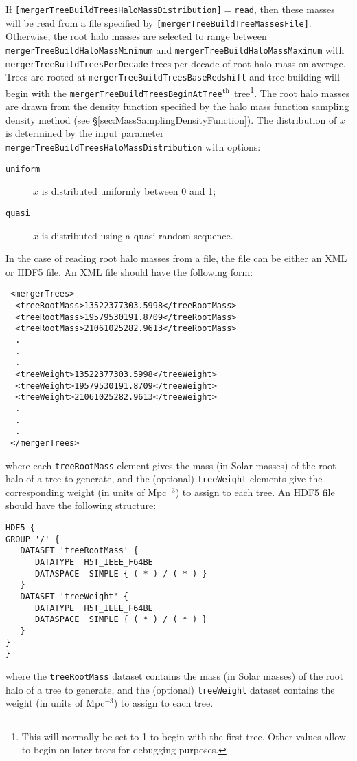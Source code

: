 If {\tt [mergerTreeBuildTreesHaloMassDistribution]}$=${\tt read}, then these masses will be read from a file specified by {\tt [mergerTreeBuildTreeMassesFile]}. Otherwise, the root halo masses are selected to range between {\tt mergerTreeBuildHaloMassMinimum} and {\tt mergerTreeBuildHaloMassMaximum} with {\tt mergerTreeBuildTreesPerDecade} trees per decade of root halo mass on average. Trees are rooted at {\tt mergerTreeBuildTreesBaseRedshift} and tree building will begin with the {\tt mergerTreeBuildTreesBeginAtTree}$^{\rm th}$ tree\footnote{This will normally be set to 1 to begin with the first tree. Other values allow to begin on later trees for debugging purposes.}. The root halo masses are drawn from the density function specified by the halo mass function sampling density method (see \S\ref{sec:MassSamplingDensityFunction}). The distribution of $x$ is determined by the input parameter {\tt mergerTreeBuildTreesHaloMassDistribution} with options:
\begin{description}
 \item [{\tt uniform}] $x$ is distributed uniformly between 0 and 1;
 \item [{\tt quasi}] $x$ is distributed using a quasi-random sequence.
\end{description}

In the case of reading root halo masses from a file, the file can be either an XML or HDF5 file. An XML file should have the following form:
\begin{verbatim}
 <mergerTrees>
  <treeRootMass>13522377303.5998</treeRootMass>
  <treeRootMass>19579530191.8709</treeRootMass>
  <treeRootMass>21061025282.9613</treeRootMass>
  .
  .
  .
  <treeWeight>13522377303.5998</treeWeight>
  <treeWeight>19579530191.8709</treeWeight>
  <treeWeight>21061025282.9613</treeWeight>
  .
  .
  .
 </mergerTrees>
\end{verbatim}
where each {\tt treeRootMass} element gives the mass (in Solar masses) of the root halo of a tree to generate, and the (optional) {\tt treeWeight} elements give the corresponding weight (in units of Mpc$^{-3}$) to assign to each tree. An HDF5 file should have the following structure:
\begin{verbatim}
HDF5 {
GROUP '/' {
   DATASET 'treeRootMass' {
      DATATYPE  H5T_IEEE_F64BE
      DATASPACE  SIMPLE { ( * ) / ( * ) }
   }
   DATASET 'treeWeight' {
      DATATYPE  H5T_IEEE_F64BE
      DATASPACE  SIMPLE { ( * ) / ( * ) }
   }
}
}
\end{verbatim}
where the {\tt treeRootMass} dataset contains the mass (in Solar masses) of the root halo of a tree to generate, and the (optional) {\tt treeWeight} dataset contains the weight (in units of Mpc$^{-3}$) to assign to each tree.

